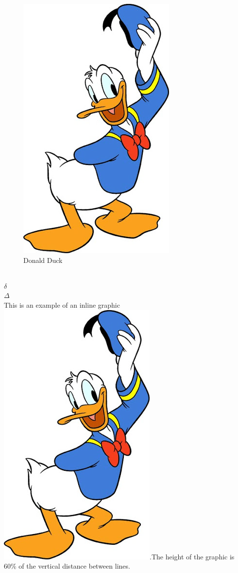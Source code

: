 \documentclass[12pt]{article}
\begin{document}
\blindtext
\begin{figure}[h]
	\begin{center}
	\includegraphics{donald.png}
	\end{center}
\caption{Donald Duck}
\end{figure}
\blindtext\\
$\delta$\\
$\Delta$
\\
This is an example of an inline graphic \includegraphics[height=0.6\baselineskip]{Donald.png}.The height of the graphic is 60\% of the vertical distance between lines.
\end{document}
